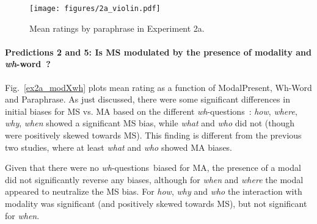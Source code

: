 \documentclass[12pt,letterpaper,table,svgnames,dvipsnames]{article}
\newcommand{\figref}[1]{Fig.~\ref{#1}}
\newcommand{\whqs}{\emph{wh}-questions~}
\newcommand{\whw}{\emph{wh}-word~}
\begin{document}
\begin{figure}[h!]
\centering
\texttt{[image: figures/2a\_violin.pdf]}
\caption{Mean ratings by paraphrase in Experiment 2a.}
\label{ex2a_violin}
\end{figure}


\paragraph{Predictions 2 and 5: Is MS modulated by the presence of modality and \whw?}
\figref{ex2a_modXwh} plots mean rating as a function of ModalPresent, Wh-Word and Paraphrase. As just discussed, there were some significant differences in initial biases for MS vs. MA based on the different \whqs: \emph{how}, \emph{where}, \emph{why}, \emph{when} showed a significant MS bias, while \emph{what} and \emph{who} did not (though were positively skewed towards MS). This finding is different from the previous two studies, where at least \emph{what} and \emph{who} showed MA biases.

Given that there were no \whqs biased for MA, the presence of a modal did not significantly reverse any biases, although for \emph{when} and \emph{where} the modal appeared to neutralize the MS bias. For \emph{how}, \emph{why} and \emph{who} the interaction with modality was significant (and positively skewed towards MS), but not significant for \emph{when}.
\end{document}
